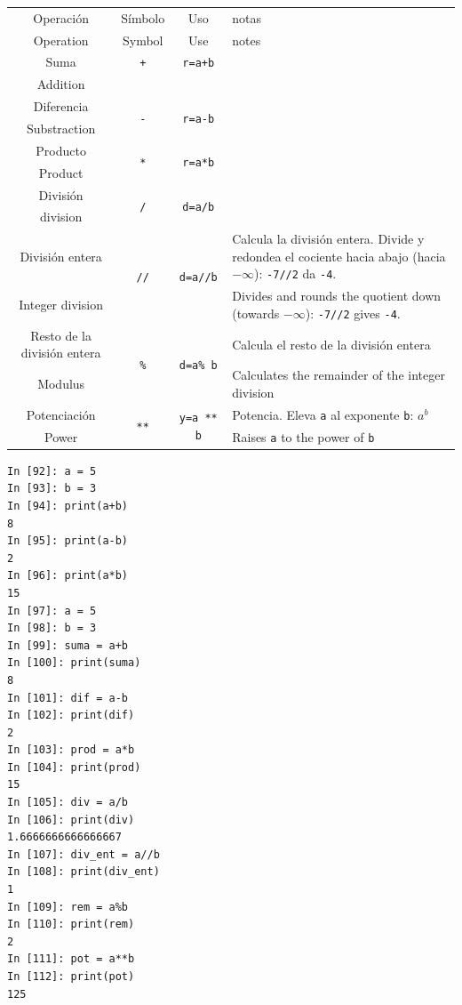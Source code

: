 \begin{table}[h]
\label{tabop}
\centering
\begin{tabularx}{1\textwidth}{cccm{7cm}}
Operación&Símbolo&Uso&notas\\
Operation&Symbol&Use&notes\\
\hline
Suma&\texttt{+}&\texttt{r=a+b}\\
Addition\\
\hline
Diferencia&\multirow{2}{*}{\texttt{-}}&\multirow{2}{*}{\texttt{r=a-b}}\\
Substraction\\
\hline
Producto&\multirow{2}{*}{\texttt{*}}&\multirow{2}{*}{\texttt{r=a*b}}\\
Product\\
\hline
División&\multirow{2}{*}{\texttt{/}}&\multirow{2}{*}{\texttt{d=a/b}}\\
division\\
\hline
División entera& \multirow{2}{*}{\texttt{//}}& \multirow{2}{*}{\texttt{d=a//b}}&Calcula la división entera. Divide y redondea el cociente hacia abajo (hacia $-\infty$): \texttt{-7//2} da \texttt{-4}.\\
Integer division& & &Divides and rounds the quotient down (towards $-\infty$): \texttt{-7//2} gives \texttt{-4}.\\
\hline
Resto de la división entera& \multirow{2}{*}{\texttt{\%}}& \multirow{2}{*}{\texttt{d=a\% b}}& Calcula el resto de la división entera\\
Modulus& & & Calculates the remainder of the integer division\\
\hline
Potenciación&\multirow{2}{*}{\texttt{**}}&\multirow{2}{*}{\texttt{y=a ** b}}&Potencia. Eleva \texttt{a} al exponente \texttt{b}: $a^b$ \\
Power & & & Raises \texttt{a} to the power of \texttt{b}\\
\hline
\hline
\end{tabularx}
\end{table}

\begin{center}
    \begin{minipage}{.4\textwidth}
\begin{verbatim}
In [92]: a = 5
In [93]: b = 3
In [94]: print(a+b)
8
In [95]: print(a-b)
2
In [96]: print(a*b)
15
In [97]: a = 5 
In [98]: b = 3
In [99]: suma = a+b
In [100]: print(suma)
8
In [101]: dif = a-b
In [102]: print(dif)
2
In [103]: prod = a*b
In [104]: print(prod)
15
In [105]: div = a/b
In [106]: print(div)
1.6666666666666667
In [107]: div_ent = a//b
In [108]: print(div_ent)
1
In [109]: rem = a%b
In [110]: print(rem)
2
In [111]: pot = a**b
In [112]: print(pot)
125
\end{verbatim}        
    \end{minipage}
\end{center}

